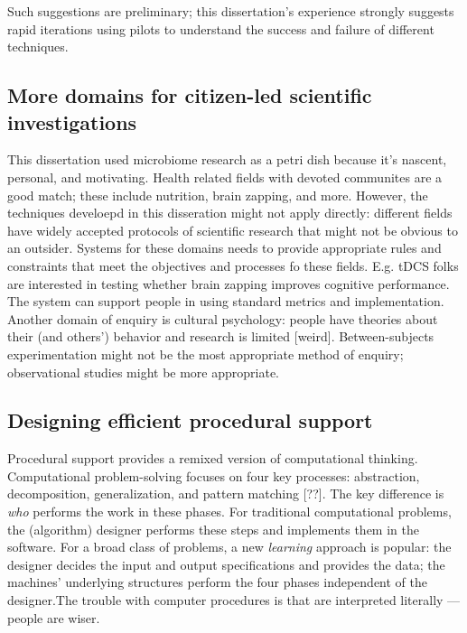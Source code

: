 Such suggestions are preliminary; this dissertation's experience strongly suggests rapid iterations using pilots to understand the success and failure of different techniques. 

\subsection{More domains for citizen-led scientific investigations}
This dissertation used microbiome research as a petri dish because it’s nascent, personal, and motivating. Health related fields with devoted communites are a good match; these include nutrition, brain zapping, and more. However, the techniques develoepd in this disseration might not apply directly: different fields have widely accepted protocols of scientific research that might not be obvious to an outsider. Systems for these domains needs to provide appropriate rules and constraints that meet the objectives and processes fo these fields. E.g. tDCS folks are interested in testing whether brain zapping improves cognitive performance. The system can support people in using standard metrics and implementation. Another domain of enquiry is cultural psychology: people have theories about their (and others') behavior and research is limited [weird]. Between-subjects experimentation might not be the most appropriate method of enquiry; observational studies might be more appropriate.

\subsection{Designing efficient procedural support}

Procedural support provides a remixed version of computational thinking. Computational problem-solving focuses on four key processes: abstraction, decomposition, generalization, and pattern matching [??]. The key difference is \textit{who} performs the work in these phases. For traditional computational problems, the (algorithm) designer performs these steps and implements them in the software. For a broad class of problems, a new \textit{learning} approach is popular: the designer decides the input and output specifications and provides the data; the machines' underlying structures perform the four phases independent of the designer.The trouble with computer procedures is that are interpreted literally — people are wiser. 

